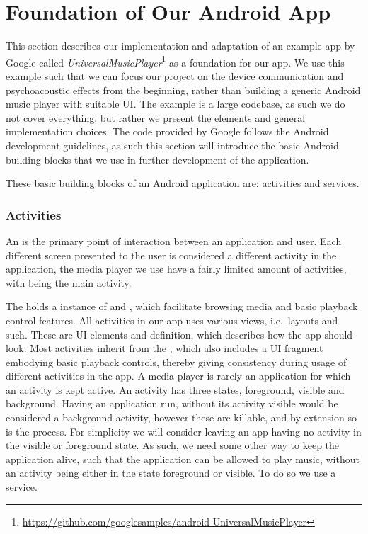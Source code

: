\section{Foundation of Our Android App}\label{sec:foundation_of_our_android_app}
This section describes our implementation and adaptation of an example app by Google called \textit{UniversalMusicPlayer}\footnote{\url{https://github.com/googlesamples/android-UniversalMusicPlayer}} as a foundation for our app.
We use this example such that we can focus our project on the device communication and psychoacoustic effects from the beginning, rather than building a generic Android music player with suitable \ac{UI}.
The example is a large codebase, as such we do not cover everything, but rather we present the elements and general implementation choices.
The code provided by Google follows the Android development guidelines, as such this section will introduce the basic Android building blocks that we use in further development of the application.

These basic building blocks of an Android application are: activities and services.

\subsubsection{Activities}\label{subsec:activities}
An  is the primary point of interaction between an application and user.
Each different screen presented to the user is considered a different activity in the application, the media player we use have a fairly limited amount of activities, with  being the main activity.

The  holds a instance of  and , which facilitate browsing media and basic playback control features.
All activities in our app uses various views, i.e.~layouts and such. These are \ac{UI} elements and definition, which describes how the app should look.
Most activities inherit from the , which also includes a \ac{UI} fragment embodying basic playback controls, thereby giving consistency during usage of different activities in the app.
A media player is rarely an application for which an activity is kept active.
An activity has three states, foreground, visible and background.
Having an application run, without its activity visible would be considered a background activity, however these are killable, and by extension so is the process.
For simplicity we will consider leaving an app having no activity in the visible or foreground state.
As such, we need some other way to keep the application alive, such that the application can be allowed to play music, without an activity being either in the state foreground or visible.
To do so we use a service.


